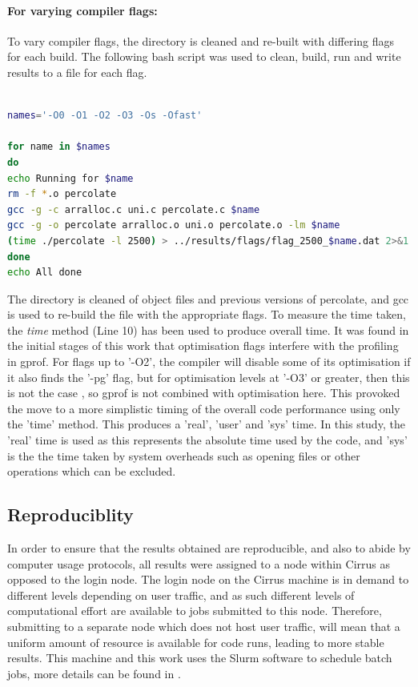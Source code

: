 \documentclass[12pt,a4paper]{article}
\begin{document}
\paragraph{For varying compiler flags:} 
To vary compiler flags, the directory is cleaned and re-built with differing flags for each build. The following bash script was used to clean, build, run and write results to a file for each flag. \begin{lstlisting}[language = bash, caption=build.sh to vary compiler flags and produce results files.]

names='-O0 -O1 -O2 -O3 -Os -Ofast'

for name in $names
do
echo Running for $name
rm -f *.o percolate
gcc -g -c arralloc.c uni.c percolate.c $name
gcc -g -o percolate arralloc.o uni.o percolate.o -lm $name
(time ./percolate -l 2500) > ../results/flags/flag_2500_$name.dat 2>&1
done
echo All done
\end{lstlisting}
The directory is cleaned of object files and previous versions of percolate, and gcc is used to re-build the file with the appropriate flags. 
To measure the time taken, the {\em time} method (Line 10) has been used to produce overall time. It was found in the initial stages of this work that optimisation flags interfere with the profiling in gprof. For flags up to '-O2', the compiler will  disable some of its optimisation if it also finds the '-pg' flag, but for optimisation levels at '-O3' or greater, then this is not the case \cite{ref:flags}, so gprof is not combined with optimisation here. This provoked the move to a more simplistic timing of the overall code performance using only the 'time' method. This produces a 'real', 'user' and 'sys' time. In this study, the 'real' time is used as this represents the absolute time used by the code, and 'sys' is the the time taken by system overheads such as opening files or other operations which can be excluded.

\subsection{Reproduciblity}\label{reproducibility}

In order to ensure that the results obtained are reproducible, and also to abide by computer usage protocols, all results were assigned to a node within Cirrus \cite{ref:cirrus} as opposed to the login node. The login node on the Cirrus machine is in demand to different levels depending on user traffic, and as such different levels of computational effort are available to jobs submitted to this node. Therefore, submitting to a separate node which does not host user traffic, will mean that a uniform amount of resource is available for code runs, leading to more stable results. This machine and this work uses the Slurm software to schedule batch jobs, more details can be found in \cite{ref:cirrus}. 
\end{document}
